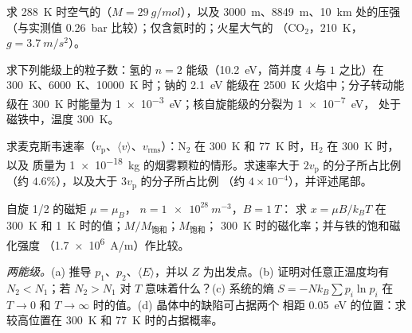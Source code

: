 \begin{exercise}[$\star$]\label{exo:b2:boltzmann-factor:1}
求 \qty{288}{K} 时空气的（$M = \qty{29}{g/mol}$），以及
\qty{3000}{m}、\qty{8849}{m}、\qty{10}{km} 处的压强（与实测值
\qty{0.26}{bar} 比较）；仅含氦时的；火星大气的
（CO$_2$，\qty{210}{K}，$g = \qty{3.7}{m/s^2}$）。
\end{exercise}

\begin{exercise}[$\star$]\label{exo:b2:boltzmann-factor:2}
求下列能级上的粒子数：氢的 $n = 2$ 能级（\qty{10.2}{eV}，简并度 $4$
与 $1$ 之比）在 \qty{300}{K}、\qty{6000}{K}、\qty{10000}{K} 时；钠的
\qty{2.1}{eV} 能级在 \qty{2500}{K} 火焰中；分子转动能级在
\qty{300}{K} 时能量为 \qty{1e-3}{eV}；核自旋能级的分裂为 \qty{1e-7}{eV}，
处于磁铁中，温度 \qty{300}{K}。
\end{exercise}

\begin{exercise}[$\star$]\label{exo:b2:boltzmann-factor:3}
求麦克斯韦速率（$v_{\text{p}}$、$\langle v\rangle$、$v_{\text{rms}}$）：N$_2$
在 \qty{300}{K} 和 \qty{77}{K} 时，H$_2$ 在 \qty{300}{K} 时，以及
质量为 \qty{1e-18}{kg} 的烟雾颗粒的情形。求速率大于 $2v_{\text{p}}$ 的分子所占比例
（约 $4.6\%$），以及大于 $3v_{\text{p}}$ 的分子所占比例
（约 $4 \times 10^{-4}$），并评述尾部。
\end{exercise}

\begin{exercise}[$\star$]\label{exo:b2:boltzmann-factor:4}
自旋 1/2 的磁矩 $\mu = \mu_B$， $n = \qty{1e28}{m^{-3}}$，$B = \qty{1}{T}$：
求 $x = \mu B/k_BT$ 在 \qty{300}{K} 和 \qty{1}{K} 时的值；$M/M_{\text{饱和}}$；$M_{\text{饱和}}$；
\qty{300}{K} 时的磁化率；并与铁的饱和磁化强度
（\qty{1.7e6}{A/m}）作比较。
\end{exercise}

\begin{exercise}[$\star\star$]\label{exo:b2:boltzmann-factor:5}
\emph{两能级。}(a) 推导 $p_1$、$p_2$、$\langle E\rangle$，并以 $Z$ 为出发点。(b)
证明对任意正温度均有 $N_2 < N_1$；若 $N_2 >
N_1$ 对 $T$ 意味着什么？(c) 系统的熵 $S = -Nk_B\sum p_i\ln p_i$ 在
$T \to 0$ 和 $T \to \infty$ 时的值。(d) 晶体中的缺陷可占据两个
相距 \qty{0.05}{eV} 的位置：求较高位置在
\qty{300}{K} 和 \qty{77}{K} 时的占据概率。
\end{exercise}

